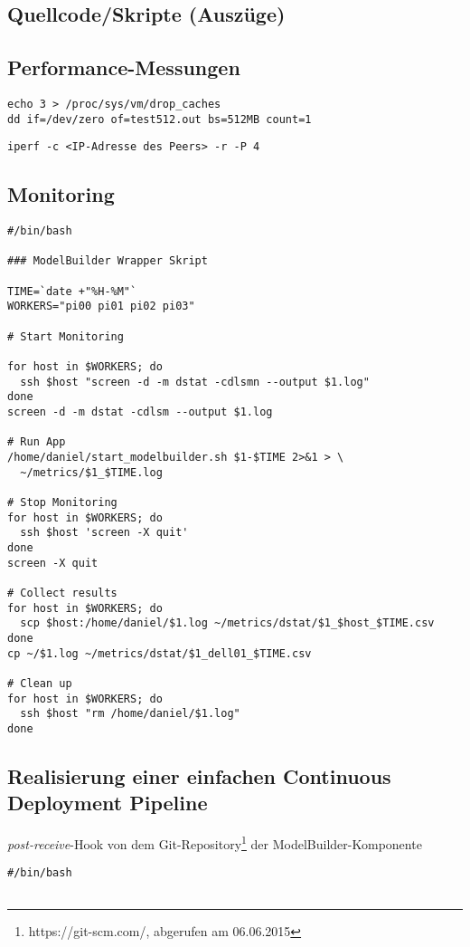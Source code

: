 \begin{appendices}
\section{Quellcode/Skripte (Auszüge)}
\subsection{Performance-Messungen}

\begin{lstlisting}[caption={Messung der Festplattenperformance - Beispiel: Schreiben einer 512MB Datei},label={lst:measure_harddrive}]
echo 3 > /proc/sys/vm/drop_caches
dd if=/dev/zero of=test512.out bs=512MB count=1
\end{lstlisting}

\begin{lstlisting}[caption={Messung der Netzwerkperformance},label={lst:measure_network}]
iperf -c <IP-Adresse des Peers> -r -P 4
\end{lstlisting}

\subsection{Monitoring}

\begin{lstlisting}[caption={Monitoring des Clusters (Betriebssystem), Beispiel ModelBuilder},label={lst:monitor_cluster}]
#/bin/bash

### ModelBuilder Wrapper Skript

TIME=`date +"%H-%M"`
WORKERS="pi00 pi01 pi02 pi03"

# Start Monitoring
	
for host in $WORKERS; do
  ssh $host "screen -d -m dstat -cdlsmn --output $1.log"
done
screen -d -m dstat -cdlsm --output $1.log

# Run App
/home/daniel/start_modelbuilder.sh $1-$TIME 2>&1 > \
  ~/metrics/$1_$TIME.log 

# Stop Monitoring
for host in $WORKERS; do
  ssh $host 'screen -X quit'
done
screen -X quit

# Collect results
for host in $WORKERS; do
  scp $host:/home/daniel/$1.log ~/metrics/dstat/$1_$host_$TIME.csv
done
cp ~/$1.log ~/metrics/dstat/$1_dell01_$TIME.csv

# Clean up
for host in $WORKERS; do
  ssh $host "rm /home/daniel/$1.log"
done
\end{lstlisting}

\subsection{Realisierung einer einfachen Continuous Deployment Pipeline}\label{subsec:pipeline}
\textit{post-receive}-Hook von dem Git-Repository\footnote{https://git-scm.com/, abgerufen am 06.06.2015} der ModelBuilder-Komponente
\begin{lstlisting}[caption={Einfache Continuous Deployment Pipeline. Beispiel: ModelBuilder},label={lst:cdp_modelbuilder}]
#/bin/bash


\end{lstlisting}
\end{appendices}
